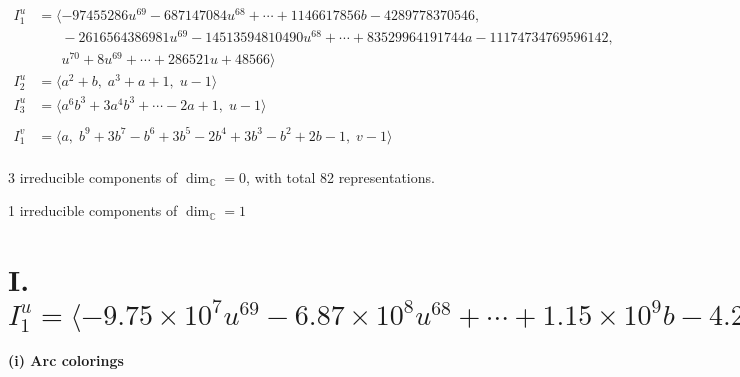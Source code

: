 \documentclass[1p]{elsarticle_modified}
\theoremstyle{definition}
\begin{document}
\begin{align*}
I^u_{1}&=\langle 
-97455286 u^{69}-687147084 u^{68}+\cdots+1146617856 b-4289778370546,\\
\phantom{I^u_{1}}&\phantom{= \langle  }-2616564386981 u^{69}-14513594810490 u^{68}+\cdots+83529964191744 a-11174734769596142,\\
\phantom{I^u_{1}}&\phantom{= \langle  }u^{70}+8 u^{69}+\cdots+286521 u+48566\rangle \\
I^u_{2}&=\langle 
a^2+b,\;a^3+a+1,\;u-1\rangle \\
I^u_{3}&=\langle 
a^6 b^3+3 a^4 b^3+\cdots-2 a+1,\;u-1\rangle \\
\\
I^v_{1}&=\langle 
a,\;b^9+3 b^7- b^6+3 b^5-2 b^4+3 b^3- b^2+2 b-1,\;v-1\rangle \\
\end{align*}
\raggedright * 3 irreducible components of $\dim_{\mathbb{C}}=0$, with total 82 representations.\\
\raggedright * 1 irreducible components of $\dim_{\mathbb{C}}=1$ \\
\newpage
\renewcommand{\arraystretch}{1}
\centering \section*{I. $I^u_{1}= \langle -9.75\times10^{7} u^{69}-6.87\times10^{8} u^{68}+\cdots+1.15\times10^{9} b-4.29\times10^{12},\;-2.62\times10^{12} u^{69}-1.45\times10^{13} u^{68}+\cdots+8.35\times10^{13} a-1.12\times10^{16},\;u^{70}+8 u^{69}+\cdots+286521 u+48566 \rangle$}
\flushleft \textbf{(i) Arc colorings}\\
\end{document}
